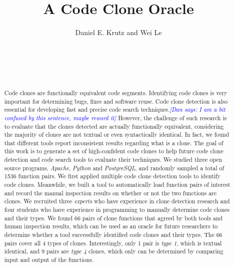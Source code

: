 \documentclass{sig-alternate}
\newcommand{\dan}[1]{\textcolor{blue}{{\it [Dan says: #1]}}}
\begin{document}

\title{A Code Clone Oracle}

\author{
%
%
\alignauthor
Daniel E. Krutz and Wei Le\\ 	
	\\
       \\
       \\
        \\
}


\maketitle
\begin{abstract}

Code clones are functionally equivalent code segments. Identifying code clones is very important for determining bugs, fixes and software reuse. Code clone detection is also essential for developing fast and precise code search techniques.\dan{I am a bit confused by this sentence, maybe reword it} However, the challenge of such research is to evaluate that the clones detected are actually functionally equivalent, considering the majority of clones are not textual or even syntactically identical. In fact, we found that different tools report inconsistent results regarding what is a clone. The goal of this work is to generate a set of high-confident code clones to help future code clone detection and code search tools to evaluate their techniques. We studied three open source programs, {\it Apache}, {\it Python} and {\it PostgreSQL}, and randomly sampled a total of 1536 function pairs. We first applied multiple code clone detection tools to identify code clones. Meanwhile, we built a tool to automatically load function pairs of interest and record the manual inspection results on whether or not the two functions are clones. We recruited three {\it experts} who have experience in clone detection research and four students who have experience in programming to manually determine code clones and their types. We found 66 pairs of clone functions that agreed by both tools and human inspection results, which can be used as an oracle for future researchers to determine whether a tool successfully identified code clones and their types. The 66 pairs cover all 4 types of clones. Interestingly, only 1 pair is {\it type 1}, which is textual identical, and 9 pairs are {\it type 4} clones, which only can be determined by comparing input and output of the functions.


\end{abstract}
\end{document}
